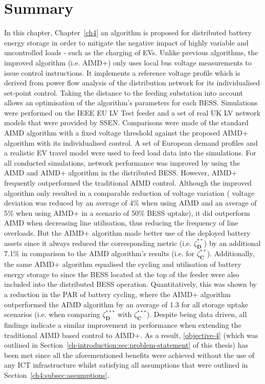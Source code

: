 \section{Summary}
\label{ch4:sec:summary}

In this chapter, Chapter~\ref{ch4} an algorithm is proposed for distributed battery energy storage in order to mitigate the negative impact of highly variable and uncontrolled loads - such as the charging of EVs.
Unlike previous algorithms, the improved algorithm (i.e. AIMD+) only uses local bus voltage measurements to issue control instructions.
It implements a reference voltage profile which is derived from power flow analysis of the distribution network for its individualised set-point control.
Taking the distance to the feeding substation into account allows an optimisation of the algorithm's parameters for each BESS.
Simulations were performed on the IEEE EU LV Test feeder and a set of real UK LV network models that were provided by SSEN.
Comparisons were made of the standard AIMD algorithm with a fixed voltage threshold against the proposed AIMD+ algorithm with its individualised control.
A set of European demand profiles and a realistic EV travel model were used to feed load data into the simulations.
For all conducted simulations, network performance was improved by using the AIMD and AIMD+ algorithm in the distributed BESS.
However, AIMD+ frequently outperformed the traditional AIMD control.
Although the improved algorithm only resulted in a comparable reduction of voltage variation ( voltage deviation was reduced by an average of 4\% when using AIMD and an average of 5\% when using AIMD+ in a scenario of 50\% BESS uptake), it did outperform AIMD when decreasing line utilisation, thus reducing the frequency of line overloads.
But the AIMD+ algorithm made better use of the deployed battery assets since it always reduced the corresponding metric (i.e. $\zeta^{**}_\textbf{D}$) by an additional 7.1\% in comparison to the AIMD algorithm's results (i.e. for $\zeta^{**}_\textbf{C}$).
Additionally, the same AIMD+ algorithm equalised the cycling and utilisation of battery energy storage to since the BESS located at the top of the feeder were also included into the distributed BESS operation.
Quantitatively, this was shown by a reduction in the PAR of battery cycling, where the AIMD+ algorithm outperformed the AIMD algorithm by an average of 1.3 for all storage uptake scenarios (i.e. when comparing $\zeta^{***}_\textbf{D}$ with $\zeta^{***}_\textbf{C}$).
Despite being data driven, all findings indicate a similar improvement in performance when extending the traditional AIMD based control to AIMD+.
As a result, \ref{objective-4} (which was outlined in Section~\ref{ch-introduction:sec:problem-statement} of this thesis) has been met since all the aforementioned benefits were achieved without the use of any ICT infrastructure whilst satisfying all assumptions that were outlined in Section~\ref{ch4:subsec:assumptions}.
